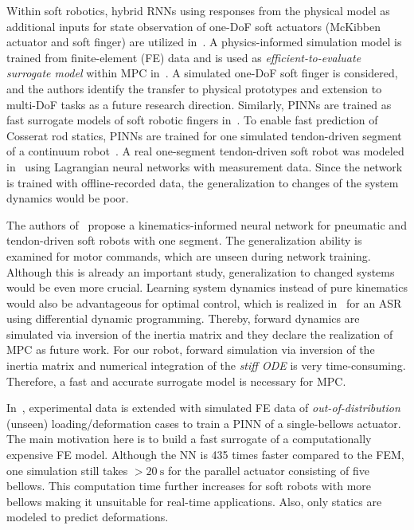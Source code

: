 Within soft robotics, hybrid RNNs using responses from the physical model as additional inputs for state observation of one-DoF soft actuators (McKibben actuator and soft finger) are utilized in~\cite{Sun.2022}. 
A physics-informed simulation model is trained from finite-element (FE) data and is used as \textit{efficient-to-evaluate surrogate model} within MPC in~\cite{Lahariya.2022}. 
A simulated one-DoF soft finger is considered, and the authors identify the transfer to physical prototypes and extension to multi-DoF tasks as a future research direction. 
Similarly, PINNs are trained as fast surrogate models of soft robotic fingers in~\cite{Wang.2024,Beaber.2024}.
To enable fast prediction of Cosserat rod statics, PINNs are trained for one simulated tendon-driven segment of a continuum robot~\cite{Bensch.2024}.
A real one-segment tendon-driven soft robot was modeled in~\cite{Liu.2024} using Lagrangian neural networks with measurement data. 
Since the network is trained with offline-recorded data, the generalization to changes of the system dynamics would be poor.

The authors of~\cite{Yoon.2024} propose a kinematics-informed neural network for pneumatic and tendon-driven soft robots with one segment. 
The generalization ability is examined for motor commands, which are unseen during network training. 
Although this is already an important study, generalization to changed systems would be even more crucial. 
Learning system dynamics instead of pure kinematics would also be advantageous for optimal control, which is realized in~\cite{Chhatoi.2023} for an ASR using differential dynamic programming. 
Thereby, forward dynamics are simulated via inversion of the inertia matrix and they declare the realization of MPC as future work. 
For our robot, forward simulation via inversion of the inertia matrix and numerical integration of the \textit{stiff ODE} is very time-consuming. 
Therefore, a fast and accurate surrogate model is necessary for MPC. 

In~\cite{Mendenhall.2024}, experimental data is extended with simulated FE data of \textit{out-of-distribution} (unseen) loading/deformation cases to train a PINN of a single-bellows actuator. 
The main motivation here is to build a fast surrogate of a computationally expensive FE model.
Although the NN is 435 times faster compared to the FEM, one simulation still takes ${>}\SI{20}{\second}$ for the parallel actuator consisting of five bellows. 
This computation time further increases for soft robots with more bellows making it unsuitable for real-time applications. 
Also, only statics are modeled to predict deformations.


